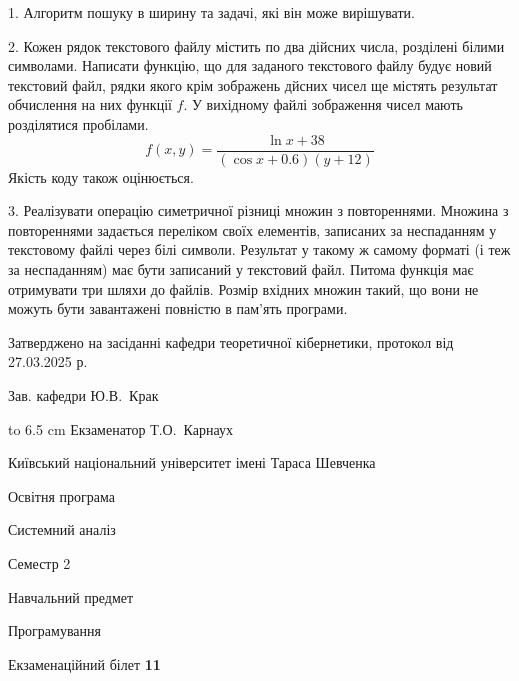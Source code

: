 \documentclass[12pt, ukrainian]{article}
\begin{document}
{%
1. Алгоритм пошуку в ширину та задачі, які він може вирішувати.%
\par
\vspace{2mm}

2. Кожен рядок текстового файлу містить по два дійсних числа, розділені білими символами.
Написати функцію, що для заданого текстового файлу будує новий текстовий файл, рядки якого крім зображень дйсних чисел ще містять результат обчислення на них функції $f$. У вихідному файлі зображення чисел мають розділятися пробілами. 
$$f(x, y) =\frac{\ln x + 38}{(\cos x + 0.6) (y + 12)}$$ 
Якість коду також оцінюється.

\par
\vspace{2mm}

3. Реалізувати операцію симетричної різниці множин з повтореннями. Множина з повтореннями задається переліком своїх елементів, записаних за неспаданням у текстовому файлі через білі символи. Результат у такому ж самому форматі (і теж за неспаданням) має бути записаний у текстовий файл. Питома функція має отримувати три шляхи до файлів. Розмір вхідних множин такий, що вони не можуть бути завантажені повністю в пам’ять програми.

}
{\smallskip\smallskip \begin {scriptsize} Затверджено на засіданні кафедри теоретичної кібернетики, протокол   від   27.03.2025 р.\par\smallskip\smallskip\smallskip\smallskip
{\parbox {6.5 cm} {Зав. кафедри \dotfill Ю.В.~Крак}}\hspace {0.7cm} {\hbox to 6.5 cm { Екзаменатор \dotfill Т.О.~Карнаух}} \end{scriptsize}}
\newpage
{{\begin {scriptsize}\par
{ \center  Київський національний університет імені Тараса Шевченка \par}
{\parbox {5 cm}{Освітня програма \hfill}{\parbox {7 cm}{Системний аналіз\hfill}}\parbox {6 cm}{\hfill Семестр 2}}\par
{\parbox {5 cm} {Навчальний предмет \hfill}\parbox {7 cm}{Програмування \hfill}\parbox {6cm}{\hfill}\par}\vspace{-15pt} \end{scriptsize}}{\center Екзаменаційний білет \No \textbf { 11 }\par}}
\end{document}
